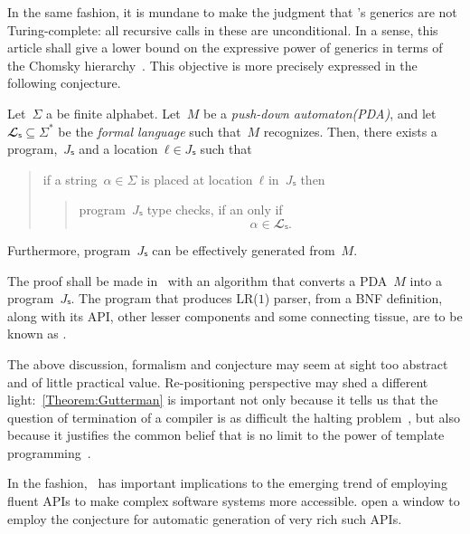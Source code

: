 In the same fashion, it is mundane to make the judgment that
  \Java's generics are not Turing-complete: all recursive calls
  in these are unconditional.
In a sense, this article shall give a lower bound on the
  expressive power of \Java generics in terms of the Chomsky hierarchy~\cite{Chomsky:1963}.
This objective is more precisely expressed in the following conjecture.

\begin{Theorem}
\label{Theorem:Gil-Levy}
Let~$Σ$ a be finite alphabet.
Let~$M$ be a \emph{push-down automaton(PDA)}, and let~$𝓛ₛ⊆Σ^*$ be
the \emph{formal language} such that~$M$ recognizes.
Then, there exists a \Java program,~$Jₛ$ and a location~$ℓ∈Jₛ$
such that
\begin{quote}
  if a string~$α∈Σ$ is
  placed at location~$ℓ$ in~$Jₛ$ then
  \begin{quote}
    program~$Jₛ$ type checks, if an only if
    \[
      α∈𝓛ₛ.
    \]
  \end{quote}
\end{quote}
Furthermore, program~$Jₛ$ can be effectively generated from~$M$.
\end{Theorem}

The proof shall be made in~ with an algorithm that converts a
  PDA~$M$ into a program~$Jₛ$.
The program that produces LR($1$) parser, from a BNF definition,
  along with its API, other lesser components and
  some connecting tissue, are to be known as \Self.

The above discussion, formalism and conjecture may seem at sight too abstract
  and of little practical value.
Re-positioning perspective may shed a different light:~\cref{Theorem:Gutterman} is important not only because it tells us
  that the question of termination of a \CC compiler is as difficult
  the halting problem~\cite{Turing:1936}, but also because it
  justifies the common belief that is no limit to the power of
  template programming~\cite{Musser:Stepanov:1989,Dehnert:Stepanov:2000
  ,Backhouse:Jansson:1999, Austern:1998,Bracha:Odersky:1998,Garcia:Jarvi:2003}.

In the fashion,~ has important
  implications to the emerging trend of employing fluent APIs
  to make complex software systems more accessible.
\Self open a window to employ the conjecture for
  automatic generation of very rich such APIs.
